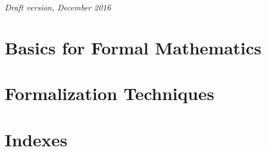 \documentclass{book}
\begin{document}
\noindent \textit{Draft version, December 2016} %
\noindent \textit{}





\tableofcontents{}

\part{Basics for Formal Mathematics}\label{part:defproofs}








\part{Formalization Techniques}\label{part:form}






% 
% 
% 
% 
% 
% 
% 

\part{Indexes}

\printindex[concept]
\printindex[ssr]
\printindex[coq]
\printindex[vernac]



\end{document}
